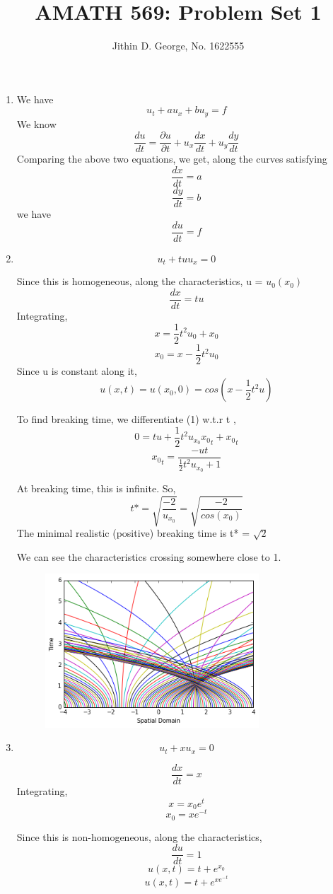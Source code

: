 \documentclass[a4paper]{article}
\title{AMATH 569: Problem Set 1}
\author{Jithin D. George, No. 1622555}
\begin{document}
\maketitle
\begin{enumerate}

	
	\item We have 
	\[ u_t +a u_x + b u_y = f\]
	We know
	\[ \frac{du}{dt} = \frac{\partial u}{\partial t} + u_x \frac{dx}{dt} + u_y \frac{dy}{dt}  \]
	Comparing the above two equations, we get, along the curves satisfying
	\[\frac{dx}{dt} =a\]
	\[\frac{dy}{dt} =b\]
	we have
\[\frac{du}{dt} =f\]
\item
 \[ u_t + tu u_x =0 \]
 
 Since this is homogeneous, along the characteristics, u = $u_0(x_0)$
 \[\frac{dx}{dt} = t u\]
 Integrating,
 \[x = \frac{1}{2}t^2 u_0 + x_0 \tag{1}\]
  \[x_0 =x - \frac{1}{2}t^2 u_0 \] 
 Since u is constant along it,
 \[u(x,t) = u(x_0,0)=cos(x - \frac{1}{2}t^2 u)\]
 
 To find breaking time, we differentiate (1) w.t.r t ,
  \[0 = t u + \frac{1}{2}t^2 u_{x_0}{x_0}_{t} +{x_0}_{t} \]
  \[{x_0}_{t} = \frac{-ut}{\frac{1}{2}t^2 u_{x_0} +1}  \]
  
  At breaking time, this is infinite.
  So, 
  \[ t* = \sqrt{\frac{-2}{ u_{x_0}}}= \sqrt{\frac{-2}{ cos(x_0)}}\]
  The minimal realistic (positive) breaking time is t* = $\sqrt{2}$
 
 We can see the characteristics crossing somewhere close to 1. 
\begin{figure}[h!] 
	\centering
	\includegraphics[width=8cm]{q_2.png}

\end{figure}

 
 \item
 \[ u_t + x u_x =0 \]
 

 \[\frac{dx}{dt} = x\]
 Integrating,
 \[x = x_0 e^t \tag{2}\]
 \[x_0 =x e^{-t} \]

  Since this is non-homogeneous, along the characteristics, 
  \[\frac{du}{dt} =1\]
  \[u(x,t)=t + e^{x_0} \]
  \[u(x,t)=t + e^{x e^{-t}} \]


\end{enumerate}
\end{document}
